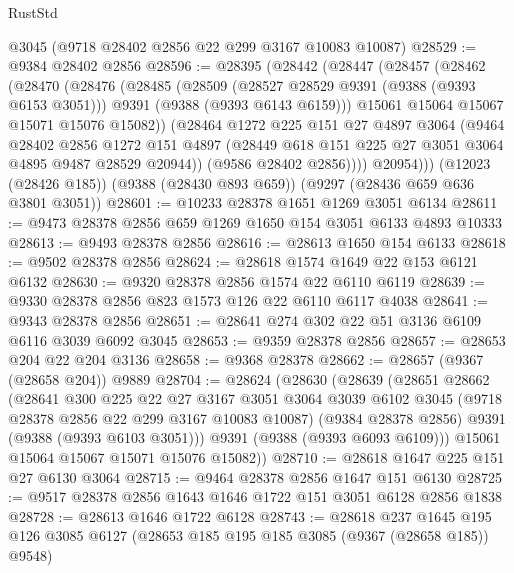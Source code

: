 \begin{lexlean}{RustStd}
\begin{coremodule}
    @3045
    (@9718 @28402 @2856 @22 @299 @3167 @10083 @10087)
@28529 := @9384 @28402 @2856
@28596 := @28395
    (@28442
      (@28447
        (@28457
          (@28462
            (@28470
              (@28476
                (@28485
                  (@28509
                    (@28527 @28529 @9391 (@9388 (@9393 @6153 @3051)))
                    @9391
                    (@9388 (@9393 @6143 @6159)))
                  @15061
                  @15064
                  @15067
                  @15071
                  @15076
                  @15082))
              (@28464
                @1272
                @225
                @151
                @27
                @4897
                @3064
                (@9464
                  @28402
                  @2856
                  @1272
                  @151
                  @4897
                  (@28449 @618 @151 @225 @27 @3051 @3064 @4895 @9487 @28529 @20944))
                (@9586 @28402 @2856))))
          @20954)))
    (@12023 (@28426 @185))
    (@9388 (@28430 @893 @659))
    (@9297 (@28436 @659 @636 @3801 @3051))
@28601 := @10233 @28378 @1651 @1269 @3051 @6134
@28611 := @9473 @28378 @2856 @659 @1269 @1650 @154 @3051 @6133 @4893 @10333
@28613 := @9493 @28378 @2856
@28616 := @28613 @1650 @154 @6133
@28618 := @9502 @28378 @2856
@28624 := @28618 @1574 @1649 @22 @153 @6121 @6132
@28630 := @9320 @28378 @2856 @1574 @22 @6110 @6119
@28639 := @9330 @28378 @2856 @823 @1573 @126 @22 @6110 @6117 @4038
@28641 := @9343 @28378 @2856
@28651 := @28641 @274 @302 @22 @51 @3136 @6109 @6116 @3039 @6092 @3045
@28653 := @9359 @28378 @2856
@28657 := @28653 @204 @22 @204 @3136
@28658 := @9368 @28378
@28662 := @28657 (@9367 (@28658 @204)) @9889
@28704 := @28624
    (@28630
      (@28639
        (@28651
          @28662
          (@28641
            @300
            @225
            @22
            @27
            @3167
            @3051
            @3064
            @3039
            @6102
            @3045
            (@9718 @28378 @2856 @22 @299 @3167 @10083 @10087)
            (@9384 @28378 @2856)
            @9391
            (@9388 (@9393 @6103 @3051)))
          @9391
          (@9388 (@9393 @6093 @6109)))
        @15061
        @15064
        @15067
        @15071
        @15076
        @15082))
@28710 := @28618 @1647 @225 @151 @27 @6130 @3064
@28715 := @9464 @28378 @2856 @1647 @151 @6130
@28725 := @9517 @28378 @2856 @1643 @1646 @1722 @151 @3051 @6128 @2856 @1838
@28728 := @28613 @1646 @1722 @6128
@28743 := @28618
    @237
    @1645
    @195
    @126
    @3085
    @6127
    (@28653 @185 @195 @185 @3085 (@9367 (@28658 @185)) @9548)

\end{coremodule}
\end{lexlean}
